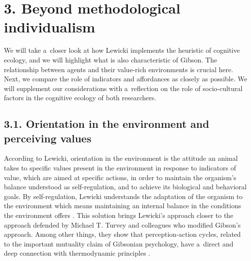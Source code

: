 \section*{3. Beyond methodological individualism}

We will take a~closer look at how Lewicki implements the heuristic of cognitive ecology, and we will highlight what is also characteristic of Gibson. The relationship between agents and their value-rich environments is crucial here. Next, we compare the role of indicators and affordances as closely as possible. We will supplement our considerations with a~reflection on the role of socio-cultural factors in the cognitive ecology of both researchers.



\subsection*{3.1. Orientation in the environment and perceiving values}



According to Lewicki, orientation in the environment is the attitude an animal takes to specific values present in the environment in response to indicators of value, which are aimed at specific actions, in order to maintain the organism's balance understood as self-regulation, and to achieve its biological and behavioral goals. By self-regulation, Lewicki understands the adaptation of the organism to the environment which means maintaining an internal balance in the conditions the environment offers 
\parencite[][p.182]{lewicki_procesy_1960}. %
 This solution brings Lewicki's approach closer to the approach defended by Michael T. Turvey and colleagues who modified Gibson's approach. Among other things, they show that perception-action cycles, related to the important mutuality claim of Gibsonian psychology, have a~direct and deep connection with thermodynamic principles 
\parencite[e.g.,][]{swenson_thermodynamic_1991}.%




